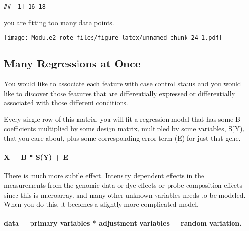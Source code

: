 \documentclass[]{article}
\newenvironment{Shaded}{\begin{snugshade}}{\end{snugshade}}
\newcommand{\KeywordTok}[1]{\textcolor[rgb]{0.13,0.29,0.53}{\textbf{#1}}}
\newcommand{\DataTypeTok}[1]{\textcolor[rgb]{0.13,0.29,0.53}{#1}}
\newcommand{\DecValTok}[1]{\textcolor[rgb]{0.00,0.00,0.81}{#1}}
\newcommand{\StringTok}[1]{\textcolor[rgb]{0.31,0.60,0.02}{#1}}
\newcommand{\OperatorTok}[1]{\textcolor[rgb]{0.81,0.36,0.00}{\textbf{#1}}}
\newcommand{\NormalTok}[1]{#1}
\let\oldparagraph\paragraph
\renewcommand{\paragraph}[1]{\oldparagraph{#1}\mbox{}}
\begin{document}
\begin{verbatim}
## [1] 16 18
\end{verbatim}

you are fitting too many data points.

\begin{Shaded}
\end{Shaded}

\texttt{[image: Module2-note\_files/figure-latex/unnamed-chunk-24-1.pdf]}

\subsection{Many Regressions at Once}\label{many-regressions-at-once}

You would like to associate each feature with case control status and
you would like to discover those features that are differentially
expressed or differentially associated with those different conditions.

Every single row of this matrix, you will fit a regression model that
has some B coefficients multiplied by some design matrix, multipled by
some variables, S(Y), that you care about, plus some corresponding error
term (E) for just that gene.

\paragraph{X = B * S(Y) + E}\label{x-b-sy-e}

There is much more subtle effect. Intensity dependent effects in the
measurements from the genomic data or dye effects or probe composition
effects since this is microarray, and many other unknown variables needs
to be modeled. When you do this, it becomes a slightly more complicated
model.

\paragraph{data = primary variables * adjustment variables + random
variation.}\label{data-primary-variables-adjustment-variables-random-variation.}
\end{document}
